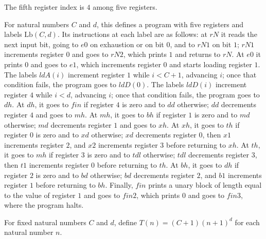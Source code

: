 \begin{definition}
\label{Complexity.UTab.Front.rD}
\leanok
The fifth register index is $4$ among five registers.
\end{definition}

\begin{definition}
\label{Complexity.UTab.Front.prog}
\leanok
{}
For natural numbers $C$ and $d$, this defines a program with five registers and labels
$\mathrm{Lb}(C,d)$. Its instructions at each label are as follows: at $rN$ it reads the
next input bit, going to $e0$ on exhaustion or on bit $0$, and to $rN1$ on bit $1$;
$rN1$ increments register $0$ and goes to $rN2$, which prints $1$ and returns to $rN$.
At $e0$ it prints $0$ and goes to $e1$, which increments register $0$ and starts loading
register $1$. The labels $ldA(i)$ increment register $1$ while $i<C+1$, advancing $i$;
once that condition fails, the program goes to $ldD(0)$. The labels $ldD(i)$ increment
register $4$ while $i<d$, advancing $i$; once that condition fails, the program goes to
$dh$. At $dh$, it goes to $fin$ if register $4$ is zero and to $dd$ otherwise; $dd$
decrements register $4$ and goes to $mh$. At $mh$, it goes to $bh$ if register $1$ is
zero and to $md$ otherwise; $md$ decrements register $1$ and goes to $xh$. At $xh$, it
goes to $th$ if register $0$ is zero and to $xd$ otherwise; $xd$ decrements register
$0$, then $x1$ increments register $2$, and $x2$ increments register $3$ before
returning to $xh$. At $th$, it goes to $mh$ if register $3$ is zero and to $tdl$
otherwise; $tdl$ decrements register $3$, then $t1$ increments register $0$ before
returning to $th$. At $bh$, it goes to $dh$ if register $2$ is zero and to $bd$
otherwise; $bd$ decrements register $2$, and $b1$ increments register $1$ before
returning to $bh$. Finally, $fin$ prints a unary block of length equal to the value of
register $1$ and goes to $fin2$, which prints $0$ and goes to $fin3$, where the program
halts.
\end{definition}

\begin{definition}
\label{Complexity.UTab.Front.tb}
\leanok
For fixed natural numbers $C$ and $d$, define $T(n)=(C+1)(n+1)^d$ for each natural
number $n$.
\end{definition}

